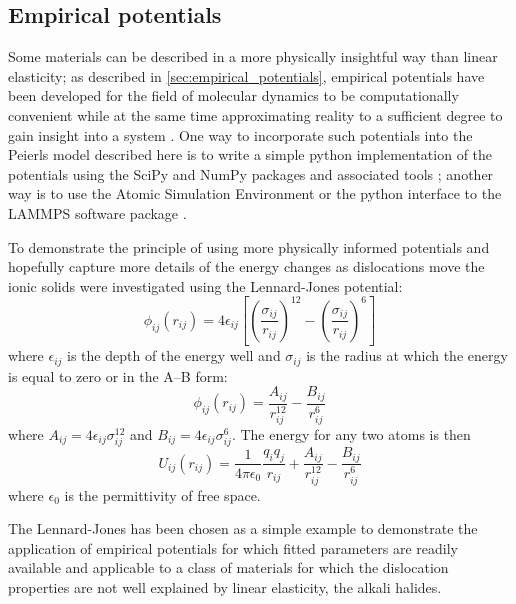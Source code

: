 



\subsection{Empirical potentials}

Some materials can be described in a more physically insightful way than linear elasticity; as described in \autoref{sec:empirical_potentials}, empirical potentials have been developed for the field of molecular dynamics to be computationally convenient while at the same time approximating reality to a sufficient degree to gain insight into a system \cite{martinez2013}. One way to incorporate such potentials into the Peierls model described here is to write a simple python implementation of the potentials using the SciPy and NumPy packages and associated tools \cite{Numpy2011,Ipython2007,Millman2007,SciPy2001}; another way is to use the Atomic Simulation Environment \cite{ASE2017} or the python interface to the LAMMPS software package \cite{Plimpton1995,LAMMPS_web}.



To demonstrate the principle of using more physically informed potentials and hopefully capture more details of the energy changes as dislocations move the ionic solids were investigated using the Lennard-Jones potential:
\begin{equation}
\phi_{ij}(r_{ij}) = 4\epsilon_{ij} \left[ \left( \frac{\sigma_{ij}}{r_{ij}}\right)^{12}-     \left( \frac{\sigma_{ij}}{r_{ij}}\right)^6   \right]
\end{equation}
where $\epsilon_{ij}$ is the depth of the energy well and $\sigma_{ij}$ is the radius at which the energy is equal to zero or in the A--B form:
\begin{equation}
\phi_{ij}(r_{ij}) = \frac{A_{ij}}{r_{ij}^{12}} - \frac{B_{ij}}{r_{ij}^{6}}
\end{equation}
where $A_{ij} = 4\epsilon_{ij}\sigma_{ij}^{12}$ and $B_{ij} = 4 \epsilon_{ij} \sigma_{ij}^{6}$. The energy for any two atoms is then 
\begin{equation}
U_{ij}(r_{ij}) = \frac{1}{4\pi\epsilon_0} \frac{q_i q_j}{r_{ij}} + \frac{A_{ij}}{r_{ij}^{12}} - \frac{B_{ij}}{r_{ij}^{6}}
\end{equation}
where $\epsilon_0$ is the permittivity of free space.

The Lennard-Jones has been chosen as a simple example to demonstrate the application of empirical potentials for which fitted parameters are readily available \cite{Mao2014} and applicable to a class of materials for which the dislocation properties are not well explained by linear elasticity, the alkali halides.



